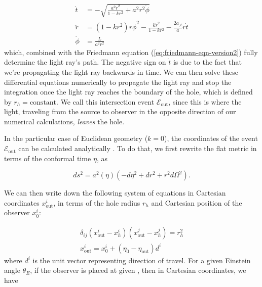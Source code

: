 \begin{subequations}
  \begin{align}
    \dot{t} &= -\sqrt{\frac{a^2\dot{r}^2}{1-kr^2} + a^2r^2 \dot{\phi}}\\
    \ddot{r}  &= (1-kr^2)r\dot{\phi}^2 - \frac{k\dot{r}^2}{1-kr^2} - \frac{2a_{,t}}{a}\dot{r}\dot{t}\\
    \dot{\phi} &= \frac{L}{a^2 r^2}
  \end{align}
  \label{eq:frw-null-geodesics}
\end{subequations}
which, combined with the Friedmann equation (\autoref{eq:friedmann-eqn-version2}) fully determine the light ray's path. The negative sign on $\dot{t}$ is due to the fact that we're propagating the light ray backwards in time. We can then solve these differential equations numerically to propagate the light ray and stop the integration once the light ray reaches the boundary of the hole, which is defined by $r_h = \text{constant}$. We call this intersection event $\mathcal{E}_{\text{out}}$, since this is where the light, traveling from the source to observer in the opposite direction of our numerical calculations, \emph{leaves} the hole. 

In the particular case of Euclidean geometry ($k = 0$), the coordinates of the event $\mathcal{E}_{\text{out}}$ can be calculated analytically \citep{fleury2013interpretation}. To do that, we first rewrite the flat metric in terms of the conformal time $\eta$, as

\begin{equation}
  ds^2 = a^2(\eta) \left ( -d \eta^2 + dr^2 + r^2 d \Omega^2 \right ).
  \label{eq:frw-metric-conformal-time}
\end{equation}

We can then write down the following system of equations in Cartesian coordinates $x^i_{\text{out}}$, in terms of the hole radius $r_h$ and Cartesian position of the observer $x^i_0$:

\begin{subequations}
  \begin{align}
  \delta_{ij} (x^i_{\text{out}} - x^i_h)(x^j_{\text{out}} - x^j_h) = r_h^2\\
  x^i_{\text{out}} = x^i_0 + (\eta_0 - \eta_{\text{out}})d^i    
  \end{align}
  \label{eq:flat-cartesian-frw}
\end{subequations}
where $d^i$ is the unit vector representing direction of travel. For a given Einstein angle $\theta_E$, if the observer is placed at given , then in Cartesian coordinates, we have 

